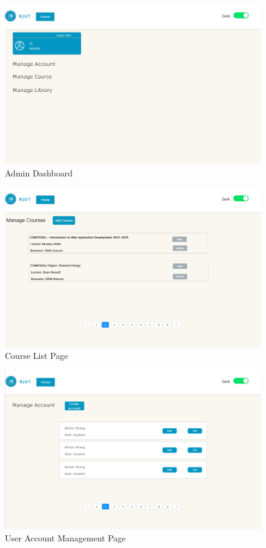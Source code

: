 \documentclass[12pt]{article}
\begin{document}
\begin{figure}[H]
    \centering
    \includegraphics[width=\textwidth]{mockups/admin/admindash.png}
    \caption{Admin Dashboard}
    \label{fig:admin_dashboard_page}
\end{figure}

\begin{figure}[H]
    \centering
    \includegraphics[width=\textwidth]{mockups/admin/courselist.png}
    \caption{Course List Page}
    \label{fig:admin_courselist_page}
\end{figure}

\begin{figure}[H]
    \centering
    \includegraphics[width=\textwidth]{mockups/admin/useraccount.png}
    \caption{User Account Management Page}
    \label{fig:admin_useraccount_page}
\end{figure}
\end{document}
